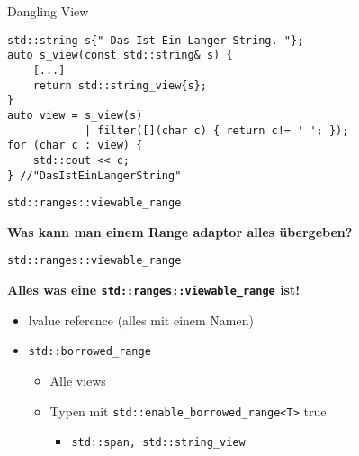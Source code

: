 \begin{frame}[fragile]{Dangling View}
    \begin{verbatim}
std::string s{" Das Ist Ein Langer String. "};
auto s_view(const std::string& s) {
    [...]
    return std::string_view{s};
}
auto view = s_view(s)
            | filter([](char c) { return c!= ' '; });
for (char c : view) {
    std::cout << c;
} //"DasIstEinLangerString"
    \end{verbatim}
\end{frame}

\begin{frame}{\texttt{std::ranges::viewable_range}}
\begin{center}
\textbf{Was kann man einem Range adaptor alles übergeben?}
\end{center}
\end{frame}

\begin{frame}{\texttt{std::ranges::viewable_range}}

    \textbf{Alles was eine \texttt{std::ranges::viewable_range} ist!}

    \begin{itemize}
        \item<2-> lvalue reference (alles mit einem Namen)
        \item<3-> \texttt{std::borrowed_range}
        \begin{itemize}
            \item<4-> Alle views
            \item<5-> Typen mit \texttt{std::enable_borrowed_range<T>} true
            \begin{itemize}
                \item<6-> \texttt{std::span, std::string_view}
            \end{itemize}
        \end{itemize}
    \end{itemize}
\end{frame}
